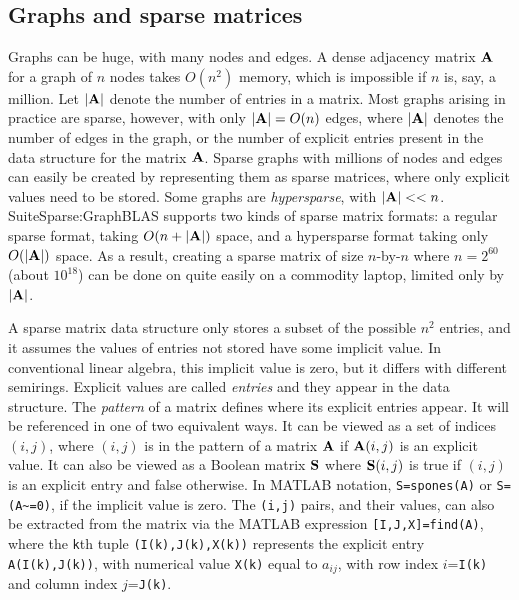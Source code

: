 \documentclass[12pt]{article}
\begin{document}
\subsection{Graphs and sparse matrices} %
\label{sparse}

Graphs can be huge, with many nodes and edges.  A dense adjacency matrix ${\bf
A}$ for a graph of $n$ nodes takes $O(n^2)$ memory, which is impossible if $n$
is, say, a million.  Let $|{\bf A}|$ denote the number of entries in a matrix.
Most graphs arising in practice are sparse, however, with only $|{\bf A}|=O(n)$
edges, where $|{\bf A}|$ denotes the number of edges in the graph, or the
number of explicit entries present in the data structure for the matrix ${\bf
A}$.  Sparse graphs with millions of nodes and edges can easily be created by
representing them as sparse matrices, where only explicit values need to be
stored.  Some graphs are {\em hypersparse}, with ${|\bf A}| << n$.
SuiteSparse:GraphBLAS supports two kinds of sparse matrix formats: a regular
sparse format, taking $O(n+|{\bf A}|)$ space, and a hypersparse format taking
only $O(|{\bf A}|)$ space.  As a result, creating a sparse matrix of size
$n$-by-$n$ where $n=2^{60}$ (about $10^{18}$) can be done on quite easily on a
commodity laptop, limited only by $|{\bf A}|$.

A sparse matrix data structure only stores a subset of the possible $n^2$
entries, and it assumes the values of entries not stored have some implicit
value.  In conventional linear algebra, this implicit value is zero, but it
differs with different semirings.  Explicit values are called {\em entries} and
they appear in the data structure.  The {\em pattern} of a matrix  defines
where its explicit entries appear.  It will be referenced in one of two
equivalent ways.  It can be viewed as a set of indices $(i,j)$, where $(i,j)$
is in the pattern of a matrix ${\bf A}$ if ${\bf A}(i,j)$ is an explicit value.
It can also be viewed as a Boolean matrix ${\bf S}$ where ${\bf S}(i,j)$ is
true if $(i,j)$ is an explicit entry and false otherwise.  In MATLAB notation,
\verb'S=spones(A)' or \verb'S=(A~=0)', if the implicit value is zero.  The
\verb'(i,j)' pairs, and their values, can also be extracted from the matrix via
the MATLAB expression \verb'[I,J,X]=find(A)', where the \verb'k'th tuple
\verb'(I(k),J(k),X(k))' represents the explicit entry \verb'A(I(k),J(k))', with
numerical value \verb'X(k)' equal to $a_{ij}$, with row index $i$=\verb'I(k)'
and column index $j$=\verb'J(k)'.
\end{document}
